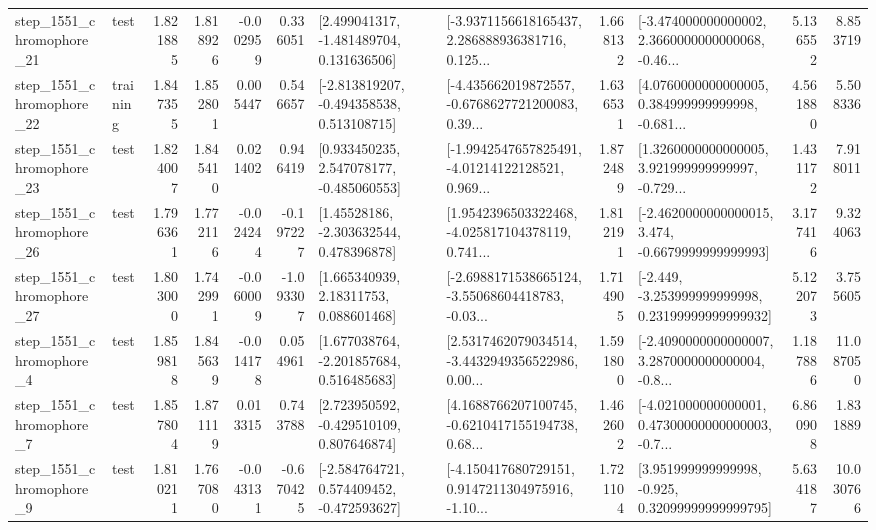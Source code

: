 \begin{tabular}{llrrrrllrlrr}
 step\_1551\_chromophore\_21 &      test &      1.821885 &    1.818926 &     -0.002959 &  0.336051 &    [2.499041317, -1.481489704, 0.131636506] &  [-3.9371156618165437, 2.286888936381716, 0.125... &       1.668132 &  [-3.474000000000002, 2.3660000000000068, -0.46... &            5.136552 &          8.853719 \\
 step\_1551\_chromophore\_22 &  training &      1.847355 &    1.852801 &      0.005447 &  0.546657 &   [-2.813819207, -0.494358538, 0.513108715] &  [-4.435662019872557, -0.6768627721200083, 0.39... &       1.636531 &  [4.0760000000000005, 0.384999999999998, -0.681... &            4.561880 &          5.508336 \\
 step\_1551\_chromophore\_23 &      test &      1.824007 &    1.845410 &      0.021402 &  0.946419 &    [0.933450235, 2.547078177, -0.485060553] &  [-1.9942547657825491, -4.01214122128521, 0.969... &       1.872489 &  [1.3260000000000005, 3.921999999999997, -0.729... &            1.431172 &          7.918011 \\
 step\_1551\_chromophore\_26 &      test &      1.796361 &    1.772116 &     -0.024244 & -0.197227 &     [1.45528186, -2.303632544, 0.478396878] &  [1.9542396503322468, -4.025817104378119, 0.741... &       1.812191 &  [-2.4620000000000015, 3.474, -0.6679999999999993] &            3.177416 &          9.324063 \\
 step\_1551\_chromophore\_27 &      test &      1.803000 &    1.742991 &     -0.060009 & -1.093307 &      [1.665340939, 2.18311753, 0.088601468] &  [-2.6988171538665124, -3.55068604418783, -0.03... &       1.714905 &  [-2.449, -3.253999999999998, 0.23199999999999932] &            5.122073 &          3.755605 \\
  step\_1551\_chromophore\_4 &      test &      1.859818 &    1.845639 &     -0.014178 &  0.054961 &    [1.677038764, -2.201857684, 0.516485683] &  [2.5317462079034514, -3.4432949356522986, 0.00... &       1.591800 &  [-2.4090000000000007, 3.2870000000000004, -0.8... &            1.187886 &         11.087050 \\
  step\_1551\_chromophore\_7 &      test &      1.857804 &    1.871119 &      0.013315 &  0.743788 &    [2.723950592, -0.429510109, 0.807646874] &  [4.1688766207100745, -0.6210417155194738, 0.68... &       1.462602 &  [-4.021000000000001, 0.47300000000000003, -0.7... &            6.860908 &          1.831889 \\
  step\_1551\_chromophore\_9 &      test &      1.810211 &    1.767080 &     -0.043131 & -0.670425 &   [-2.584764721, 0.574409452, -0.472593627] &  [-4.150417680729151, 0.9147211304975916, -1.10... &       1.721104 &   [3.951999999999998, -0.925, 0.32099999999999795] &            5.634187 &         10.030766 \\

\end{tabular}
